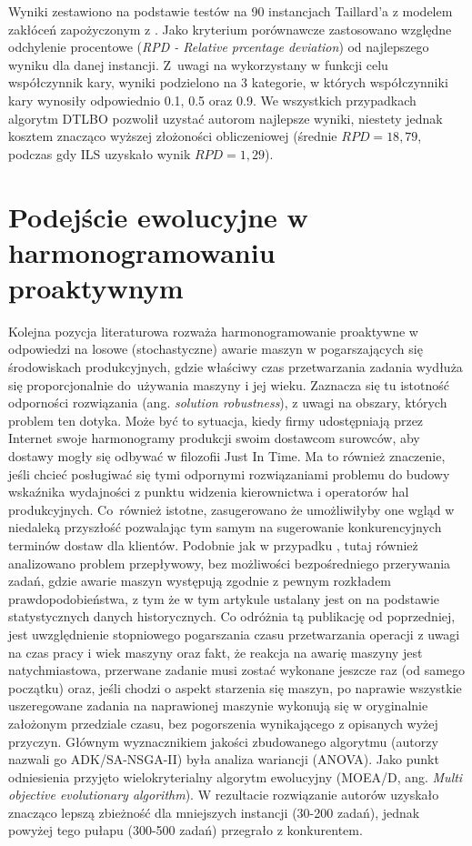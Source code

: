 \documentclass[printmode,oneside]{mgr}
\begin{document}
Wyniki zestawiono na podstawie testów na 90 instancjach Taillard'a z modelem zakłóceń zapożyczonym z \cite{Katragjini2013}. Jako kryterium porównawcze zastosowano względne odchylenie procentowe (\emph{RPD - Relative prcentage deviation}) od najlepszego wyniku dla danej instancji. Z~uwagi na wykorzystany w funkcji celu współczynnik kary, wyniki podzielono na 3 kategorie, w których współczynniki kary wynosiły odpowiednio 0.1, 0.5 oraz 0.9. We wszystkich przypadkach algorytm DTLBO pozwolił uzystać autorom najlepsze wyniki, niestety jednak kosztem znacząco wyższej złożoności obliczeniowej (średnie $RPD = 18,79$, podczas gdy ILS uzyskało wynik $RPD = 1,29$).
%
\section[Podejście ewolucyjne w harmonogramowaniu  proaktywnym]{Podejście ewolucyjne w harmonogramowaniu\\ proaktywnym}
Kolejna pozycja literaturowa \cite{KBEPS} rozważa harmonogramowanie proaktywne w odpowiedzi na losowe (stochastyczne) awarie maszyn w pogarszających się środowiskach produkcyjnych, gdzie właściwy czas przetwarzania zadania wydłuża się proporcjonalnie do~używania maszyny i jej wieku. Zaznacza się tu istotność odporności rozwiązania (ang. \emph{solution robustness}), z uwagi na obszary, których problem ten dotyka. Może być to sytuacja, kiedy firmy udostępniają przez Internet swoje harmonogramy produkcji swoim dostawcom surowców, aby dostawy mogły się odbywać w filozofii Just In Time. Ma to również znaczenie, jeśli chcieć posługiwać się tymi odpornymi rozwiązaniami problemu do budowy wskaźnika wydajności z punktu widzenia kierownictwa i operatorów hal produkcyjnych. \mbox{Co również} istotne, zasugerowano że umożliwiłyby one wgląd w niedaleką przyszłość pozwalając tym samym na sugerowanie konkurencyjnych terminów dostaw dla klientów. Podobnie jak w przypadku \cite{DTLBO}, tutaj również analizowano problem przepływowy, bez możliwości bezpośredniego przerywania zadań, gdzie awarie maszyn występują zgodnie z pewnym rozkładem prawdopodobieństwa, z tym że w tym artykule ustalany jest on na podstawie statystycznych danych historycznych. Co odróżnia tą publikację od poprzedniej, jest uwzględnienie stopniowego pogarszania czasu przetwarzania operacji z uwagi na czas pracy i wiek maszyny oraz fakt, że reakcja na awarię maszyny jest natychmiastowa, przerwane zadanie musi zostać wykonane jeszcze raz (od samego początku) oraz, jeśli chodzi o aspekt starzenia się maszyn, po naprawie wszystkie uszeregowane zadania na naprawionej maszynie wykonują się w oryginalnie założonym przedziale czasu, bez pogorszenia wynikającego z opisanych wyżej przyczyn. Głównym wyznacznikiem jakości zbudowanego algorytmu (autorzy nazwali go ADK/SA-NSGA-II) była analiza wariancji (ANOVA). Jako punkt odniesienia przyjęto wielokryterialny algorytm ewolucyjny (MOEA/D, ang. \emph{Multi objective evolutionary algorithm}). W rezultacie rozwiązanie autorów uzyskało znacząco lepszą zbieżność dla mniejszych instancji (30-200 zadań), jednak powyżej tego pułapu (300-500 zadań) przegrało z konkurentem.  
%
\end{document}
